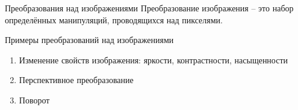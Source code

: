 \documentclass{beamer}
\begin{document}
\begin{frame}{Преобразования над изображениями}
        \alert{Преобразование изображения} -- это набор определённых манипуляций, проводящихся над пикселями.

	\begin{alertblock}{Примеры преобразований над изображениями}
		\begin{enumerate}
			\item Изменение свойств изображения: яркости, контрастности, насыщенности
			\item Перспективное преобразование
			\item Поворот
		\end{enumerate}
	\end{alertblock}


\end{frame}
\end{document}
